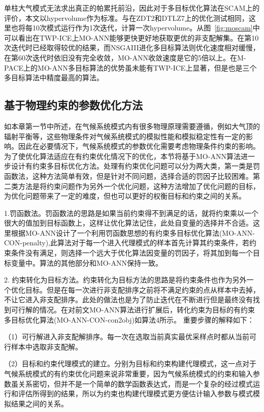 单柱大气模式无法求出真正的帕累托前沿，因此对于多目标优化算法在SCAM上的评价，本文以hypervolume作为标准。与在ZDT2和DTLZ7上的优化测试相同，这里也将每10次模式运行作为1次迭代，计算一次hypervolume。从图~\ref{fig:moscam}中可以看出在TWP-ICE上MO-ANN能够更快更好地获取更优的非支配解集。在第10次迭代时已经取得较优的结果，而NSGAIII进化多目标算法则优化速度相对缓慢，在第60次迭代时依旧没有完全收敛，MO-ANN收敛速度是它的5倍以上。在M-PACE上的MO-ANN多目标算法的优势虽未能有TWP-ICE上显著，但是也是三个多目标算法中精度最高的算法。

\subsection{基于物理约束的参数优化方法}
如本章第一节中所述，在气候系统模式内有很多物理原理需要遵循，例如大气顶的辐射平衡等，这些物理条件对气候系统模式的模拟性能和模拟稳定性有一定的影响。因此在必要情况下，气候系统模式的参数优化需要考虑物理条件约束的影响。为了使优化算法适应在有约束优化情况下的优化，本节将基于MO-ANN算法进一步设计有约束多目标优化方法。处理有约束优化问题可以分为两大类，第一类是罚函数法，这种方法简单有效，但是针对不同问题，选择合适的罚因子比较困难。第二类方法是将约束问题作为另外一个优化问题，这种方法增加了优化问题的目标，为优化问题带来了一定的难度，但也可以更好的权衡目标和约束之间的关系。

1.罚函数法。罚函数法的思路是如果当前约束得不到满足的话，就将约束乘以一个很大的值加到目标函数上，这样让优化算法记住，此处自变量的选择并不合适。这里根据MO-ANN设计了一个利用罚函数思想的有约束多目标优化算法(MO-ANN-CON-penalty),此算法对于每一个进入代理模式的样本首先计算其约束条件，若约束条件没有满足，则选择一个远大于优化算法因变量的罚因子，将其加到每一个目标变量中。算法的其他部分和MO-ANN保持一致。

2. 约束转化为目标方法。约束转化为目标方法的思路是将约束条件也作为另外一个优化目标。但是在每一次进行非支配排序之前将不满足约束的点从样本中去掉，不让它进入非支配排序。此处的做法也是为了防止迭代在不断进行但是最终没有找到可行解的情况。在对前文MO-ANN算法进行扩展后，转化约束为目标的有约束多目标优化算法(MO-ANN-CON-con2obj)如算法4所示。
重要步骤的解释如下：

（1）可行解进入非支配解排序。每一次在选取当前真实最优采样点时都从当前可行样本中选取非支配解。

（2）目标和约束代理模式的建立。分别为目标和约束构建代理模式，这一点对于气候系统模式的有约束优化问题来说非常重要，因为气候系统模式的约束和输入参数虽关系密切，但并不是一个简单的数学函数表达式，而是一个复杂的经过模式运行和评估所得到的结果，所以为约束也构建代理模式更方便估计输入参数与模式模拟结果之间的关系。


